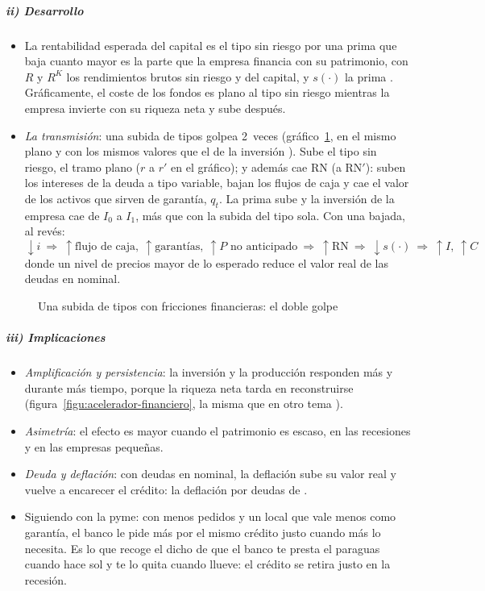 \documentclass[11pt]{article}
\begin{document}
\subparagraph{ii) Desarrollo}
\begin{itemize}
\item La rentabilidad esperada del capital es el tipo sin riesgo por una prima que baja cuanto mayor es la parte que la empresa financia con su patrimonio\nocite{BernankeGertlerGilchrist1999},
  con $R$ y $R^K$ los rendimientos brutos sin riesgo y del capital, y $s(\cdot)$ la prima . Gráficamente, el coste de los fondos es plano al tipo sin riesgo mientras la empresa invierte con su riqueza neta y sube después.
\item \emph{La transmisión}: una subida de tipos golpea 2~veces (gráfico~\ref{fig:coste-fondos-politica}, en el mismo plano y con los mismos valores que el de la inversión ). Sube el tipo sin riesgo, el tramo plano ($r$ a $r'$ en el gráfico); y además cae RN (a RN$'$): suben los intereses de la deuda a tipo variable, bajan los flujos de caja y cae el valor de los activos que sirven de garantía, $q_t$. La prima sube y la inversión de la empresa cae de $I_0$ a $I_1$, más que con la subida del tipo sola\nocite{BernankeGertler1995}. Con una bajada, al revés:
  \[\downarrow i\ \Rightarrow\ \uparrow\text{flujo de caja},\ \uparrow\text{garantías},\ \uparrow P\text{ no anticipado}\ \Rightarrow\ \uparrow\mathrm{RN}\ \Rightarrow\ \downarrow s(\cdot)\ \Rightarrow\ \uparrow I,\ \uparrow C\]
  donde un nivel de precios mayor de lo esperado reduce el valor real de las deudas en nominal.
\end{itemize}

\begin{figure}[H]
\centering
\caption{Una subida de tipos con fricciones financieras: el doble golpe}\label{fig:coste-fondos-politica}
\end{figure}

\subparagraph{iii) Implicaciones}
\begin{itemize}
\item \emph{Amplificación y persistencia}: la inversión y la producción responden más y durante más tiempo, porque la riqueza neta tarda en reconstruirse (figura~\ref{figu:acelerador-financiero}, la misma que en otro tema ).
\item \emph{Asimetría}: el efecto es mayor cuando el patrimonio es escaso, en las recesiones y en las empresas pequeñas.
\item \emph{Deuda y deflación}: con deudas en nominal, la deflación sube su valor real y vuelve a encarecer el crédito: la deflación por deudas de \textcite{Fisher1933} .
\item Siguiendo con la pyme: con menos pedidos y un local que vale menos como garantía, el banco le pide más por el mismo crédito justo cuando más lo necesita. Es lo que recoge el dicho de que el banco te presta el paraguas cuando hace sol y te lo quita cuando llueve: el crédito se retira justo en la recesión.
\end{itemize}
\end{document}
